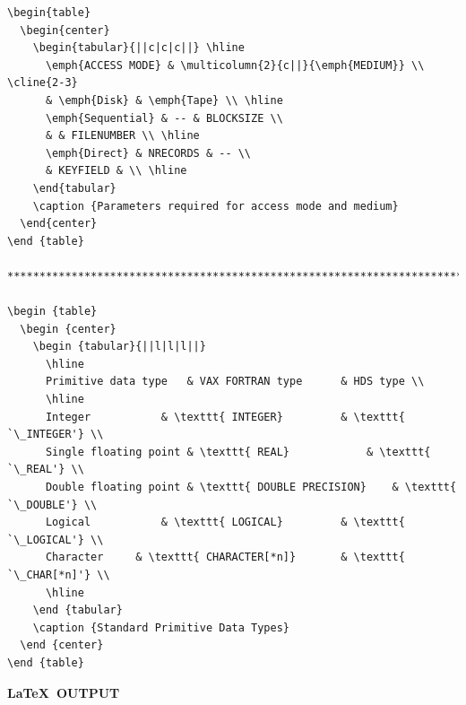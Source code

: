 \documentclass[twoside,11pt]{article}
\renewcommand{\_}{\texttt{\symbol{95}}}
\begin{document}
\begin{verbatim}
\begin{table}
  \begin{center}
    \begin{tabular}{||c|c|c||} \hline
      \emph{ACCESS MODE} & \multicolumn{2}{c||}{\emph{MEDIUM}} \\ \cline{2-3}
      & \emph{Disk} & \emph{Tape} \\ \hline
      \emph{Sequential} & -- & BLOCKSIZE \\
      & & FILENUMBER \\ \hline
      \emph{Direct} & NRECORDS & -- \\
      & KEYFIELD & \\ \hline
    \end{tabular}
    \caption {Parameters required for access mode and medium}
  \end{center}
\end {table}

******************************************************************************

\begin {table}
  \begin {center}
    \begin {tabular}{||l|l|l||}
      \hline
      Primitive data type	& VAX FORTRAN type		& HDS type \\
      \hline
      Integer			& \texttt{ INTEGER}			& \texttt{ `\_INTEGER'} \\
      Single floating point	& \texttt{ REAL}			& \texttt{ `\_REAL'} \\
      Double floating point	& \texttt{ DOUBLE PRECISION}	& \texttt{ `\_DOUBLE'} \\
      Logical			& \texttt{ LOGICAL}			& \texttt{ `\_LOGICAL'} \\
      Character		& \texttt{ CHARACTER[*n]}		& \texttt{ `\_CHAR[*n]'} \\
      \hline
    \end {tabular}
    \caption {Standard Primitive Data Types}
  \end {center}
\end {table}
\end{verbatim}

\newpage

\begin{center}
  \textbf{\LaTeX\ OUTPUT}
\end{center}
\end{document}
